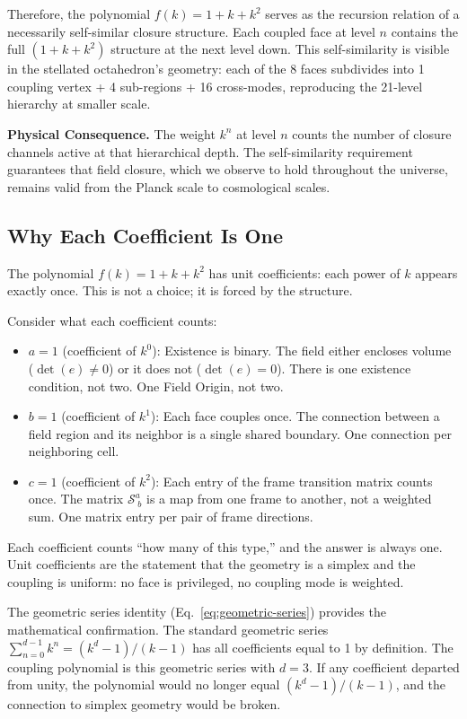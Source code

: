 \documentclass[aps,prd,preprint,superscriptaddress,showpacs,preprintnumbers,amsmath,amssymb,nofootinbib]{revtex4-2}
\begin{document}
Therefore, the polynomial $f(k) = 1 + k + k^2$ serves as the recursion relation of a necessarily self-similar closure structure. Each coupled face at level $n$ contains the full $(1 + k + k^2)$ structure at the next level down. This self-similarity is visible in the stellated octahedron's geometry: each of the 8 faces subdivides into 1 coupling vertex + 4 sub-regions + 16 cross-modes, reproducing the 21-level hierarchy at smaller scale.

\textbf{Physical Consequence.}
The weight $k^n$ at level $n$ counts the number of closure channels active at that hierarchical depth. The self-similarity requirement guarantees that field closure, which we observe to hold throughout the universe, remains valid from the Planck scale to cosmological scales.

\subsection{Why Each Coefficient Is One}
\label{subsec:coefficients}

The polynomial $f(k) = 1 + k + k^2$ has unit coefficients: each power of $k$ appears exactly once. This is not a choice; it is forced by the structure.

Consider what each coefficient counts:
\begin{itemize}
\item $a = 1$ (coefficient of $k^0$): Existence is binary. The field either encloses volume ($\det(e) \neq 0$) or it does not ($\det(e) = 0$). There is one existence condition, not two. One Field Origin, not two.
\item $b = 1$ (coefficient of $k^1$): Each face couples once. The connection between a field region and its neighbor is a single shared boundary. One connection per neighboring cell.
\item $c = 1$ (coefficient of $k^2$): Each entry of the frame transition matrix counts once. The matrix $\mathcal{S}^a_{\;b}$ is a map from one frame to another, not a weighted sum. One matrix entry per pair of frame directions.
\end{itemize}

Each coefficient counts ``how many of this type,'' and the answer is always one. Unit coefficients are the statement that the geometry is a simplex and the coupling is uniform: no face is privileged, no coupling mode is weighted.

The geometric series identity (Eq.~\ref{eq:geometric-series}) provides the mathematical confirmation. The standard geometric series $\sum_{n=0}^{d-1} k^n = (k^d - 1)/(k - 1)$ has all coefficients equal to 1 by definition. The coupling polynomial is this geometric series with $d = 3$. If any coefficient departed from unity, the polynomial would no longer equal $(k^d - 1)/(k - 1)$, and the connection to simplex geometry would be broken.
\end{document}
